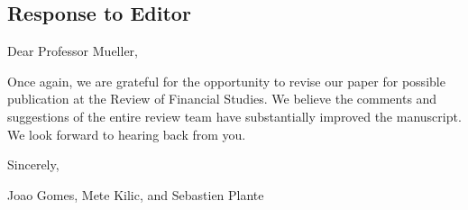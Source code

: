 \documentclass[hidelinks,11pt]{article}
\begin{document}
    \vspace*{-1.0cm}

    \begin{center}
        \section*{Response to Editor}
    \end{center}

    \noindent Dear Professor Mueller, 

    

    \bigskip

    Once again, we are grateful for the opportunity to revise our paper for possible publication at the Review of Financial Studies. We believe the comments and suggestions of the entire review team have substantially improved the manuscript. We look forward to hearing back from you. 

    Sincerely, 

    Joao Gomes, Mete Kilic, and Sebastien Plante

    \newpage
    
    
\end{document}
